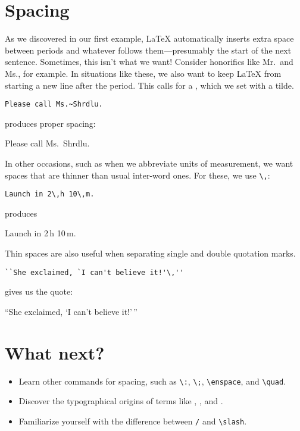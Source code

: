 \section{Spacing}

As we discovered in our first example,
\LaTeX{} automatically inserts extra space between periods and whatever
follows them---presumably the start of the next sentence.
Sometimes, this isn't what we want!
Consider honorifics like Mr.\ and Ms., for example.
In situations like these, we also want to keep \LaTeX{} from starting a new line
after the period.
This calls for a , which we set with a tilde.
\begin{leftfigure}
\begin{lstlisting}
Please call Ms.~Shrdlu.
\end{lstlisting}
\end{leftfigure}
produces proper spacing:
\begin{leftfigure}
\lm%
Please call Ms.~Shrdlu.
\end{leftfigure}

In other occasions, such as when we abbreviate units of measurement,
we want spaces that are thinner than usual inter-word ones.
For these, we use \verb|\,|:
\begin{leftfigure}
\begin{lstlisting}
Launch in 2\,h 10\,m.
\end{lstlisting}
\end{leftfigure}
produces
\begin{leftfigure}
\lm%
Launch in 2\,h 10\,m.
\end{leftfigure}
Thin spaces are also useful when separating single and double quotation marks.
\begin{leftfigure}
\begin{lstlisting}
``She exclaimed, `I can't believe it!'\,''
\end{lstlisting}
\end{leftfigure}
gives us the quote:
\begin{leftfigure}
\lm%
``She exclaimed, `I can't believe it!'\,''
\end{leftfigure}

\section{What next?}
\begin{itemize}
\item Learn other commands for spacing, such as \verb|\:|, \verb|\;|,
    \verb|\enspace|, and \verb|\quad|.
\item Discover the typographical origins of terms like ,
    , and .
\item Familiarize yourself with the difference between \texttt{/} and
    \verb|\slash|.
\end{itemize}
